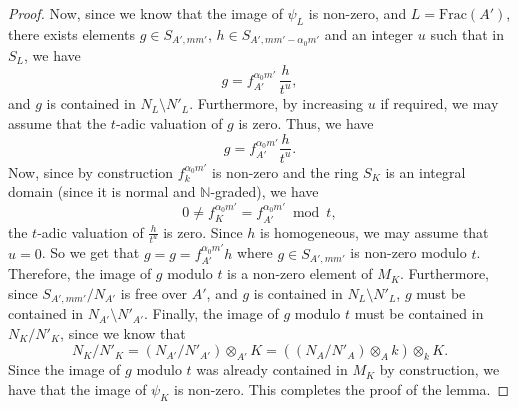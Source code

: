 \documentclass[10pt,a4paper]{amsart}
\newcommand{\N}{\mathbb{N}}
\begin{document}
\begin{proof}
    
    Now, since we know that the image of $\psi_L$ is non-zero, and $L =\text{Frac}(A')$, there exists elements $g \in S_{A', mm'}$, $h \in S_{A', mm' - \alpha_0 m'}$ and an integer $u$ such that in $S_L$, we have
    \[ g = f_{A'} ^{\alpha_0 m'} \, \frac{h}{t^{u}}, \]
    and $g$ is contained in $N_L \setminus N' _L$. Furthermore, by increasing $u$ if required, we may assume that the $t$-adic valuation of $g$ is zero. Thus, we have
    \[ g = f_{A'} ^{ \alpha _0 m'} \frac{h}{t^u}. \]
    Now, since by construction $f_k ^{\alpha_0 m'}$ is non-zero and the ring $S_K$ is an integral domain (since it is normal and $\N$-graded), we have 
    \[ 0 \neq f^{\alpha_0  m'} _{K} = f^{\alpha_0  m'} _{A'} \bmod{t}, \] 
    the $t$-adic valuation of $\frac{h}{t^{u}}$ is zero. Since $h$ is homogeneous, we may assume that $u = 0$. So we get that 
    $g = g = f_{A'} ^{ \alpha _0 m'} h$
    where $g \in S_{A', mm'}$ is non-zero modulo $t$. Therefore, the image of $g$ modulo $t$ is a non-zero element of $M_K$. Furthermore, since 
    $S_{A', mm'}/N_{A'}$ is free over $A'$, and $g$ is contained in $N_L \setminus N'_L$, $g$ must be contained in $N_{A'} \setminus N' _{A'}$. Finally, the image of $g$ modulo $t$ must be contained in $N_K/N'_K$, since we know that 
    \[ N_K/N'_K = \left(N_{A'}/N'_{A'} \right) \otimes _{A'} K =\left( \left(N_{A}/N'_{A} \right) \otimes _{A} k \right) \otimes_k K.  \]
    Since the image of $g$ modulo $t$ was already contained in $M_K$ by construction, we have that the image of $\psi_K$ is non-zero. This completes the proof of the lemma. 
\end{proof}
\end{document}
